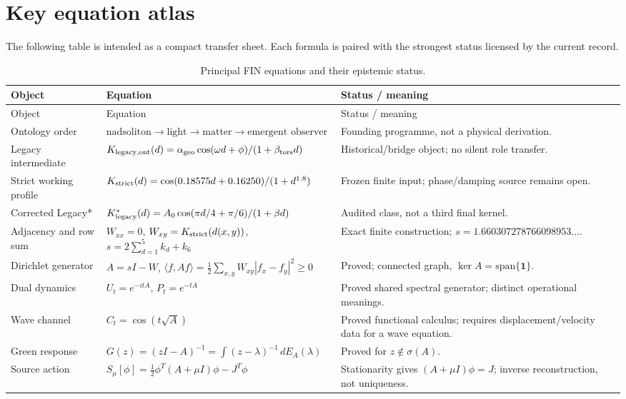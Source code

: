 \documentclass[11pt,a4paper]{article}
\theoremstyle{definition}
\theoremstyle{remark}
\newcommand{\one}{\bm 1}
\begin{document}
\appendix
\section{Key equation atlas}

The following table is intended as a compact transfer sheet. Each formula is paired with the strongest status licensed by the current record.

\begingroup\small
\begin{longtable}{@{}p{}p{}p{}@{}}
\caption{Principal FIN equations and their epistemic status.}\\
\toprule
Object & Equation & Status / meaning\\
\midrule
\endfirsthead
\toprule
Object & Equation & Status / meaning\\
\midrule
\endhead
Ontology order & $\text{nadsoliton}\to\text{light}\to\text{matter}\to\text{emergent observer}$ & Founding programme, not a physical derivation.\\[1mm]
Legacy intermediate & $K_{\rm legacy,ont}(d)=\alpha_{\rm geo}\cos(\omega d+\phi)/(1+\beta_{\rm tors}d)$ & Historical/bridge object; no silent role transfer.\\[1mm]
Strict working profile & $K_{\rm strict}(d)=\cos(0.18575d+0.16250)/(1+d^{1.8})$ & Frozen finite input; phase/damping source remains open.\\[1mm]
Corrected Legacy* & $K^*_{\rm legacy}(d)=A_0\cos(\pi d/4+\pi/6)/(1+\beta d)$ & Audited class, not a third final kernel.\\[1mm]
Adjacency and row sum & $W_{xx}=0$, $W_{xy}=K_{\rm strict}(d(x,y))$, $s=2\sum_{d=1}^5k_d+k_6$ & Exact finite construction; $s=1.660307278766098953\ldots$.\\[1mm]
Dirichlet generator & $A=sI-W$, $\langle f,Af\rangle=\frac12\sum_{x,y}W_{xy}|f_x-f_y|^2\ge0$ & Proved; connected graph, $\ker A=\mathrm{span}\{\one\}$.\\[1mm]
Dual dynamics & $U_t=e^{-itA}$, $P_t=e^{-tA}$ & Proved shared spectral generator; distinct operational meanings.\\[1mm]
Wave channel & $C_t=\cos(t\sqrt A)$ & Proved functional calculus; requires displacement/velocity data for a wave equation.\\[1mm]
Green response & $G(z)=(zI-A)^{-1}=\int(z-\lambda)^{-1}\,dE_A(\lambda)$ & Proved for $z\notin\sigma(A)$.\\[1mm]
Source action & $S_\mu[\phi]=\frac12\phi^T(A+\mu I)\phi-J^T\phi$ & Stationarity gives $(A+\mu I)\phi=J$; inverse reconstruction, not uniqueness.\\[1mm]

\end{longtable}
\end{document}

